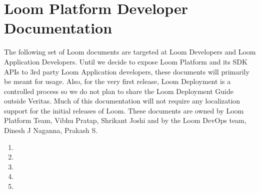 \documentclass[letterpaper,10pt,english]{sphinxmanual}
\begin{document}
\section{Loom Platform Developer Documentation}
\label{\detokenize{loom_topindex:loom-platform-developer-documentation}}
The following set of Loom documents are targeted at Loom Developers and Loom Application Developers. Until we decide to expose Loom Platform and its SDK APIs to 3rd party Loom Application developers, these documents will primarily be meant for  usage. Also, for the very first release, Loom Deployment is a controlled process so we do not plan to share the Loom Deployment Guide outside Veritas. Much of this documentation will not require any localization support for the initial releases of Loom.  These documents are owned by Loom Platform Team, Vibhu Pratap, Shrikant Joshi and by the Loom DevOps team, Dinesh J Naganna, Prakash S.
\begin{enumerate}
\item {} 

\item {} 

\item {} 

\item {} 

\item {} 

\end{enumerate}



\renewcommand{\indexname}{Index}
\printindex
\end{document}
